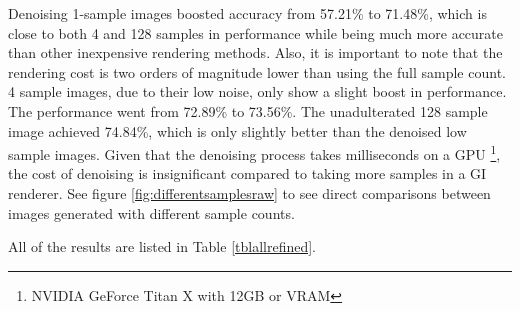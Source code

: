 \documentclass[10pt,twocolumn,letterpaper]{article}
\begin{document}
Denoising 1-sample images boosted accuracy from 57.21\% to 71.48\%, which is close to both 4 and 128 samples in performance while being much more accurate than other inexpensive rendering methods. Also, it is important to note that the rendering cost is two orders of magnitude lower than using the full sample count. 4 sample images, due to their low noise, only show a slight boost in performance.  The performance went from 72.89\% to 73.56\%.  The unadulterated 128 sample image achieved 74.84\%, which is only slightly better than the denoised low sample images.  Given that the denoising process takes milliseconds on a GPU \footnote{NVIDIA GeForce Titan X with 12GB or VRAM}, the cost of denoising is insignificant compared to taking more samples in a GI renderer.  See figure \ref{fig:differentsamplesraw} to see direct comparisons between images generated with different sample counts.

All of the results are listed in Table \ref{tblallrefined}.

\end{document}
